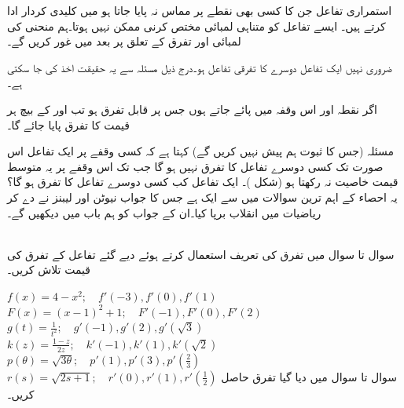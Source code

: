 استمراری تفاعل جن کا کسی بھی نقطے پر مماس نہ پایا جاتا ہو  میں کلیدی کردار ادا کرتے ہیں۔ ایسے تفاعل کو متناہی لمبائی مختص کرنی ممکن نہیں ہوتا۔ہم منحنی کی لمبائی اور تفرق کے تعلق پر بعد میں غور کریں گے۔

ضروری نہیں   ایک تفاعل  دوسرے کا تفرقی تفاعل ہو۔درج ذیل مسئلہ سے یہ  حقیقت  اخذ کی جا سکتی ہے۔

اگر  نقطہ  اور   اس وقفہ میں پائے جاتے ہوں جس پر    قابل تفرق ہو   تب     اور  کے بیچ ہر قیمت کا تفرق  پایا جائے گا۔ 

مسئلہ  (جس کا ثبوت ہم پیش نہیں کریں گے)  کہتا ہے کہ کسی وقفے پر ایک تفاعل اس صورت تک کسی دوسرے تفاعل کا تفرق نہیں ہو گا جب تک اس وقفے پر یہ متوسط قیمت خاصیت نہ رکھتا ہو (شکل )۔ ایک تفاعل کب کسی دوسرے تفاعل کا تفرق ہو گا؟ یہ احصاء کے اہم ترین سوالات میں سے ایک ہے جس کا جواب نیوٹن اور لیبنز نے دے کر ریاضیات میں انقلاب برپا کیا۔ان کے جواب کو ہم باب  میں دیکھیں گے۔

\\
سوال  تا سوال  میں تفرق کی تعریف استعمال کرتے ہوئے دیے گئے تفاعل کے تفرق کی قیمت تلاش کریں۔  

\quad
$f(x)=4-x^2; \quad f'(-3), f'(0), f'(1)$
$F(x)=(x-1)^2+1;\quad F'(-1), F'(0), F'(2)$
$g(t)=\tfrac{1}{t^2};\quad g'(-1), g'(2), g'(\sqrt{3})$
$k(z)=\tfrac{1-z}{2z};\quad k'(-1), k'(1), k'(\sqrt{2})$
$p(\theta)=\sqrt{3\theta};\quad p'(1), p'(3), p'(\tfrac{2}{3})$
\quad
$r(s)=\sqrt{2s+1};\quad r'(0), r'(1), r'(\tfrac{1}{2})$
سوال  تا سوال  میں دیا گیا تفرق حاصل کریں۔

